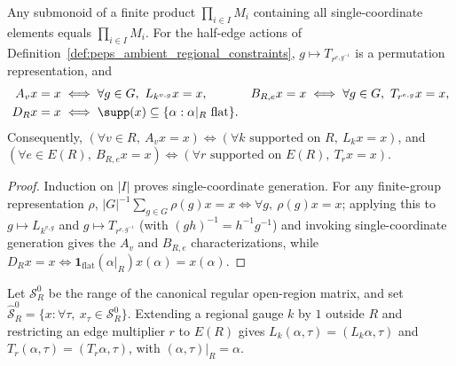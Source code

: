\begin{lemma}%
    \label{thm:peps_regular_constraint_fixed_spaces}
    \leanok
    Any submonoid of a finite product $\prod_{i\in I}M_i$ containing all
    single-coordinate elements equals $\prod_{i\in I}M_i$.
    For the half-edge actions of Definition~\ref{def:peps_ambient_regional_constraints},
    $g\mapsto T_{r^{e,g^{-1}}}$ is a permutation representation, and
    \begin{align}
        A_vx=x     & \iff \forall g\in G,\ L_{k^{v,g}}x=x,                   &
        B_{R,e}x=x & \iff \forall g\in G,\ T_{r^{e,g}}x=x, \notag                         \\
        D_Rx=x     & \iff \supp(x)\subseteq\{\alpha:\alpha|_R\text{ flat}\}. &   & \notag
    \end{align}
    Consequently, $(\forall v\in R,\ A_vx=x)\iff(\forall k\text{ supported on }R,\ L_kx=x)$,
    and $(\forall e\in E(R),\ B_{R,e}x=x)\iff(\forall r\text{ supported on }E(R),\ T_rx=x)$.
\end{lemma}
\begin{proof}\leanok
    Induction on $|I|$ proves single-coordinate generation.
    For any finite-group representation $\rho$, $|G|^{-1}\sum_{g\in G}\rho(g)x=x
        \iff\forall g,\ \rho(g)x=x$; applying this to $g\mapsto L_{k^{v,g}}$ and
    $g\mapsto T_{r^{e,g^{-1}}}$ (with $(gh)^{-1}=h^{-1}g^{-1}$) and invoking
    single-coordinate generation gives the $A_v$ and $B_{R,e}$ characterizations,
    while $D_Rx=x\iff\mathbf1_{\mathrm{flat}}(\alpha|_R)x(\alpha)=x(\alpha)$.
\end{proof}

\begin{definition}%
    \label{def:peps_ambient_regular_range}
    \leanok
    Let $\mathcal S_R^0$ be the range of the canonical regular open-region
    matrix, and set
    $\widehat{\mathcal S}_R^0=\{x:\forall\tau,\ x_\tau\in\mathcal S_R^0\}$.
    Extending a regional gauge $k$ by $1$ outside $R$ and restricting an edge
    multiplier $r$ to $E(R)$ gives $L_k(\alpha,\tau)=(L_k\alpha,\tau)$ and
    $T_r(\alpha,\tau)=(T_r\alpha,\tau)$, with $(\alpha,\tau)|_R=\alpha$.
\end{definition}

